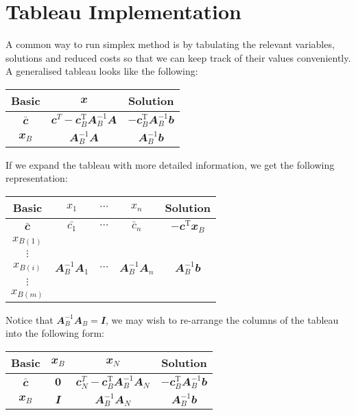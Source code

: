 \documentclass[math, code]{amznotes}
\theoremstyle{remark}
\begin{document}
\section{Tableau Implementation}
A common way to run simplex method is by tabulating the relevant variables, solutions and reduced costs so that we can keep track of their values conveniently. A generalised tableau looks like the following:
\begin{center}
    \begin{tabular}{|c|c|c|}
        \hline
        Basic & $\mathbfit{x}$ & Solution \\
        \hline
        $\mathbfit{\bar{c}}$ & $\mathbfit{c}^{T} - \mathbfit{c}_B^{\mathrm{T}}\mathbfit{A}_B^{-1}\mathbfit{A}$ & $-\mathbfit{c}_B^{\mathrm{T}}\mathbfit{A}_B^{-1}\mathbfit{b}$ \\
        \hline
        $\mathbfit{x}_B$ & $\mathbfit{A}_B^{-1}\mathbfit{A}$ & $\mathbfit{A}_B^{-1}\mathbfit{b}$ \\
        \hline
    \end{tabular}
\end{center}
If we expand the tableau with more detailed information, we get the following representation:
\begin{center}
    \begin{tabular}{|c|ccc|c|}
        \hline
        Basic & $x_1$ & $\cdots$ & $x_n$ & Solution \\
        \hline
        $\mathbfit{\bar{c}}$ & $\bar{c_1}$ & $\cdots$ & $\bar{c}_n$ & $-\mathbfit{c}^{\mathrm{T}}\mathbfit{x}_B$ \\
        \hline
        $x_{B(1)}$ & & & & \\
        $\vdots$ & & & & \\
        $x_{B(i)}$ & $\mathbfit{A}_B^{-1}\mathbfit{A}_1$ & $\cdots$ & $\mathbfit{A}_B^{-1}\mathbfit{A}_n$ & $\mathbfit{A}_B^{-1}\mathbfit{b}$ \\
        $\vdots$ & & & & \\
        $x_{B(m)}$ & & & & \\
        \hline
    \end{tabular}
\end{center}
Notice that $\mathbfit{A}_B^{-1}\mathbfit{A}_B = \mathbfit{I}$, we may wish to re-arrange the columns of the tableau into the following form:
\begin{center}
    \begin{tabular}{|c|cc|c|}
        \hline
        Basic & $\mathbfit{x}_B$ & $\mathbfit{x}_N$ & Solution \\
        \hline
        $\mathbfit{\bar{c}}$ & $\mathbf{0}$ & $\mathbfit{c}_N^{T} - \mathbfit{c}_B^{\mathrm{T}}\mathbfit{A}_B^{-1}\mathbfit{A}_N$ & $-\mathbfit{c}_B^{\mathrm{T}}\mathbfit{A}_B^{-1}\mathbfit{b}$ \\
        \hline
        $\mathbfit{x}_B$ & $\mathbfit{I}$ & $\mathbfit{A}_B^{-1}\mathbfit{A}_N$ & $\mathbfit{A}_B^{-1}\mathbfit{b}$ \\
        \hline
    \end{tabular}
\end{center}
\end{document}
